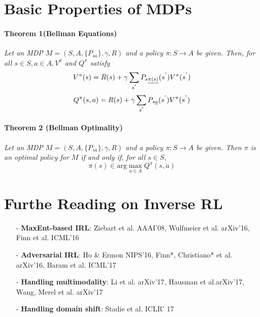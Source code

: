 \documentclass[12pt,a4paper]{article}
\begin{document}
\section{Basic Properties of MDPs}
\paragraph{Theorem 1(Bellman Equations)} \textit{Let an MDP $M = (S,A, \{P_{sa}\}, \gamma, R)$ and a policy $\pi : S \rightarrow A$ be given. Then, for all $s \in S, a \in A, V^{\pi}$ and $Q^{\pi}$ satisfy}
\begin{equation}
	V^{\pi}(s) = R(s) + \gamma \sum\limits_{s^{'}}P_{s\uline{\pi(s)}}(s^{'})V^{\pi}(s^{'})
\end{equation} 
\begin{equation}
	Q^{\pi}(s,a) = R(s) + \gamma \sum\limits_{s^{'}}P_{s\uline{a}}(s^{'})V^{\pi}(s^{'})
\end{equation}
\paragraph{Theorem 2 (Bellman Optimality)} \textit{Let an MDP $M = (S, A, \{P_{sa}\}, \gamma, R)$ and a policy $\pi : S \rightarrow A$ be given. Then $\pi$ is an optimal policy for $M$ if and only if, for all $s \in S$},
\begin{equation}
	\pi(s) \in \text{arg} \max\limits_{a \in A}Q^{\pi}(s,a)
\end{equation}

\section{Furthe Reading on Inverse RL}
\begin{itemize}
	\item[-] \textbf{MaxEnt-based IRL}: Ziebart et al. AAAI'08, Wulfmeier et al. arXiv'16, Finn et al. ICML'16
	\item[-] \textbf{Adversarial IRL}: Ho \& Ermon NIPS'16, Finn*, Christiano* et al. arXiv'16, Baram et al. ICML'17
	\item[-] \textbf{Handling multimodality}: Li et al. arXiv'17, Hausman et al.arXiv'17, Wang, Merel et al. arXiv'17
	\item[-] \textbf{Handling domain shift}: Stadie et al. ICLR' 17
\end{itemize}

%


\end{document}

